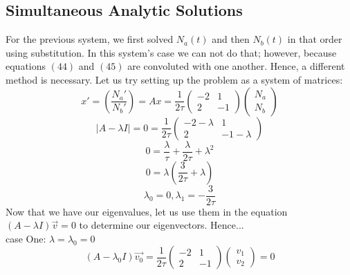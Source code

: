 \documentclass[twocolumn]{article}
\begin{document}
\subsection{Simultaneous Analytic Solutions}
\hspace{\parindent} For the previous system, we first solved $N_a(t)$ and then $N_b(t)$ in that order using substitution. In this system's case we can not do that; however, because equations $(44)$ and $(45)$ are convoluted with one another. Hence, a different method is necessary. Let us try setting up the problem as a system of matrices:
	\begin{equation}
	x'=\left(\frac{N_a'}{N_b'}\right)=Ax=
	\frac{1}{2\tau}\left(\begin{array}{cc} -2 & 1\\ 2 & -1 \end{array}\right)
	\left(\begin{array}{c} N_a\\ N_b\end{array}\right)
	\end{equation}
	\begin{equation}
	\left|A-\lambda I\right|=0=
	\frac{1}{2\tau}\left(\begin{array}{cc} -2-\lambda & 1\\ 2 & -1-\lambda \end{array}\right)
	\end{equation}
	\begin{equation}
	0=\frac{\lambda}{\tau}+\frac{\lambda}{2\tau}+\lambda^2 
	\end{equation}
	\begin{equation}
	0=\lambda\left(\frac{3}{2\tau}+\lambda\right)
	\end{equation}
	\begin{equation}
	\lambda_0=0,\lambda_1=-\frac{3}{2\tau}
	\end{equation}
Now that we have our eigenvalues, let us use them in the equation $\left(A-\lambda I\right)\vec{v}=0$ to determine our eigenvectors. Hence...
\\case One: $\lambda = \lambda_0 = 0$
	\begin{equation}
	\left(A-\lambda_0 I\right)\vec{v_0}=\frac{1}{2\tau}\left(\begin{array}{cc} -2 & 1\\ 2 & -1\end{array}	\right)\left(\begin{array}{c} v_1\\ v_2 \end{array}\right)=0
	\end{equation}
\end{document}
